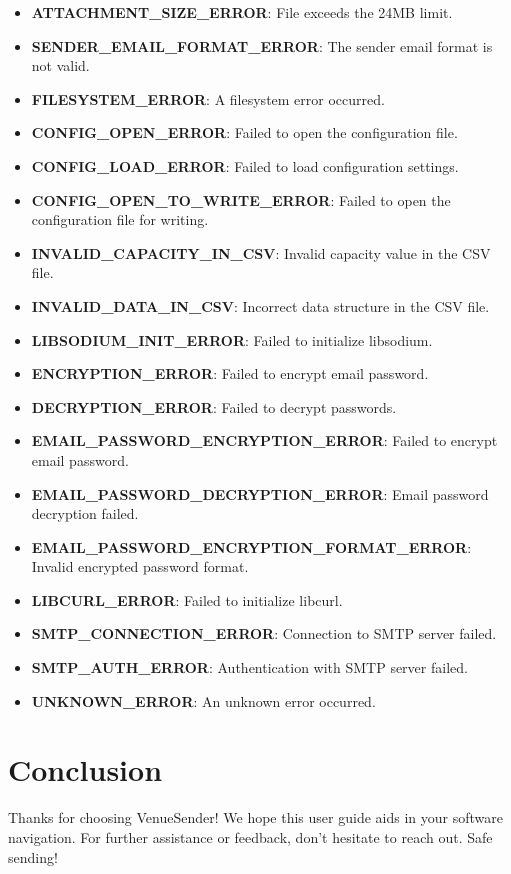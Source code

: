 \documentclass{article}
\begin{document}
\begin{itemize}
		\item \textbf{ATTACHMENT\_SIZE\_ERROR}: File exceeds the 24MB limit.
		\item \textbf{SENDER\_EMAIL\_FORMAT\_ERROR}: The sender email format is not valid.
		\item \textbf{FILESYSTEM\_ERROR}: A filesystem error occurred.
		\item \textbf{CONFIG\_OPEN\_ERROR}: Failed to open the configuration file.
		\item \textbf{CONFIG\_LOAD\_ERROR}: Failed to load configuration settings.
		\item \textbf{CONFIG\_OPEN\_TO\_WRITE\_ERROR}: Failed to open the configuration file for writing.
		\item \textbf{INVALID\_CAPACITY\_IN\_CSV}: Invalid capacity value in the CSV file.
		\item \textbf{INVALID\_DATA\_IN\_CSV}: Incorrect data structure in the CSV file.
		\item \textbf{LIBSODIUM\_INIT\_ERROR}: Failed to initialize libsodium.
		\item \textbf{ENCRYPTION\_ERROR}: Failed to encrypt email password.
		\item \textbf{DECRYPTION\_ERROR}: Failed to decrypt passwords.
		\item \textbf{EMAIL\_PASSWORD\_ENCRYPTION\_ERROR}: Failed to encrypt email password.
		\item \textbf{EMAIL\_PASSWORD\_DECRYPTION\_ERROR}: Email password decryption failed.
		\item \textbf{EMAIL\_PASSWORD\_ENCRYPTION\_FORMAT\_ERROR}: Invalid encrypted password format.
		\item \textbf{LIBCURL\_ERROR}: Failed to initialize libcurl.
		\item \textbf{SMTP\_CONNECTION\_ERROR}: Connection to SMTP server failed.
		\item \textbf{SMTP\_AUTH\_ERROR}: Authentication with SMTP server failed.
		\item \textbf{UNKNOWN\_ERROR}: An unknown error occurred.
	\end{itemize}
	
	\section*{Conclusion}
	Thanks for choosing VenueSender! We hope this user guide aids in your software navigation. For further assistance or feedback, don't hesitate to reach out. Safe sending!
	
\end{document}
